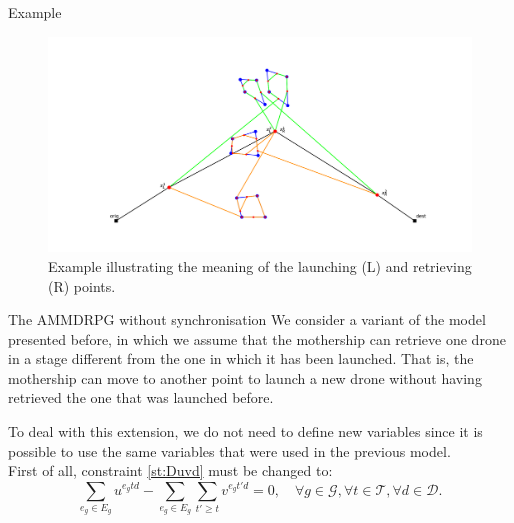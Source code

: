 \documentclass[slidestop,usepdftitle=false,10pt]{beamer}
\begin{document}
	\begin{frame}{Example}
        \begin{figure}
        \centering
        \includegraphics[width=0.95\linewidth]{figure_latex.png}
        \caption{Example illustrating the meaning of the launching  (L) and retrieving (R) points.}
        \label{fig:illustrative}
        \end{figure}
	\end{frame}
	
	\begin{frame}{The AMMDRPG without synchronisation}
	    We consider a variant of the model presented before, in which we assume that the mothership can retrieve one drone in a stage different from the one in which it has been launched. That is, the mothership can move to another point to launch a new drone without having  retrieved the one that was launched before.
        \bigskip
        
        To deal with this extension, we do not need to define new variables since it is possible to use the same variables that were used in the previous model. \\
        
        First of all, constraint \eqref{st:Duvd} must be changed to:
        {\color{red}
        \begin{equation}\label{constraint:Duv-S}
            \sum_{e_g\in E_g} u^{e_gtd} -  \sum_{e_g\in E_g} \sum_{t'\geq t} v^{e_gt'd}=0, \quad\forall  g\in\mathcal G,\forall t\in\mathcal T, \forall d\in\mathcal D.
        \end{equation}}

	\end{frame}
	
\end{document}

